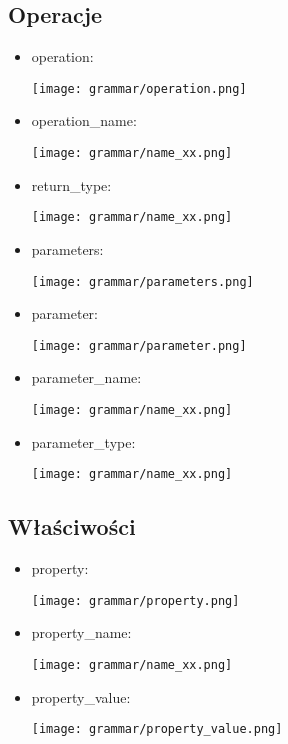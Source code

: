 \subsection{Operacje}
\begin{itemize}
\item operation:

\texttt{[image: grammar/operation.png]}

\item operation\_name:

\texttt{[image: grammar/name\_xx.png]}

\item return\_type:

\texttt{[image: grammar/name\_xx.png]}

\item parameters:

\texttt{[image: grammar/parameters.png]}

\item parameter:

\texttt{[image: grammar/parameter.png]}

\item parameter\_name:

\texttt{[image: grammar/name\_xx.png]}

\item parameter\_type:

\texttt{[image: grammar/name\_xx.png]}
\end{itemize}
\subsection{Właściwości}
\begin{itemize}
\item property:

\texttt{[image: grammar/property.png]}

\item property\_name:

\texttt{[image: grammar/name\_xx.png]}

\item property\_value:

\texttt{[image: grammar/property\_value.png]}
\end{itemize}
